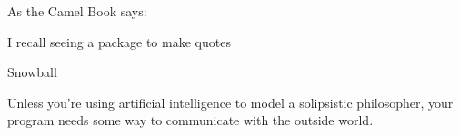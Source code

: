 As the Camel Book says:
\epigraph{I recall seeing a package to make quotes}{Snowball}

Unless you're using artificial intelligence to model a solipsistic philosopher, your program needs some way to communicate with the outside world.






% 